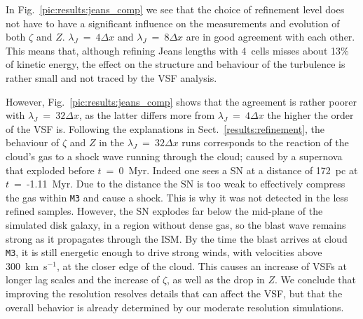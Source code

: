 In Fig.~\ref{pic:results:jeans_comp} we see that the choice of refinement level does not have to have a significant influence on the measurements and evolution of both $\zeta$ and $Z$. 
$\lambda_J$~=~$4\Delta{}x$ and $\lambda_J$~=~$8\Delta{}x$ are in 
good agreement with each other.
This means that, although refining Jeans lengths with 4~cells misses about 13\% of kinetic energy, the effect on the structure and behaviour of the turbulence is rather small and not traced by the VSF analysis.

However, Fig.~\ref{pic:results:jeans_comp} shows that the agreement is 
   rather poorer
with $\lambda_J$~=~$32\Delta{}x$, as the latter differs more from $\lambda_J$~=~$4\Delta{}x$ the higher the order of the VSF is.
Following the explanations in Sect.~\ref{results:refinement}, the behaviour of $\zeta$ and $Z$ in the $\lambda_J$~=~$32\Delta{}x$ runs corresponds to the reaction of the cloud's gas to a shock wave running through the cloud; caused by a supernova that exploded before $t$~=~0~Myr. 
Indeed one sees a SN at a distance of 172~pc at $t$~=~-1.11~Myr. 
Due to the distance the SN is too weak to effectively compress the gas within \texttt{M3} and cause a shock.
This is why it was not detected in the less refined samples.
However, the SN explodes far below the mid-plane of the simulated disk galaxy, in a region without dense gas, so
    the blast wave remains strong
as it propagates through the ISM. 
By the time the blast arrives at cloud \texttt{M3}, it is still energetic enough to drive strong winds, with velocities above 300~km~s$^{-1}$, at the closer edge of the cloud. 
This causes an increase of VSFs at longer lag scales and the increase of $\zeta$, as well as the drop in $Z$.
   We conclude that improving the resolution resolves details that can affect the VSF, 
   but that the overall behavior is already determined by our moderate resolution simulations.
